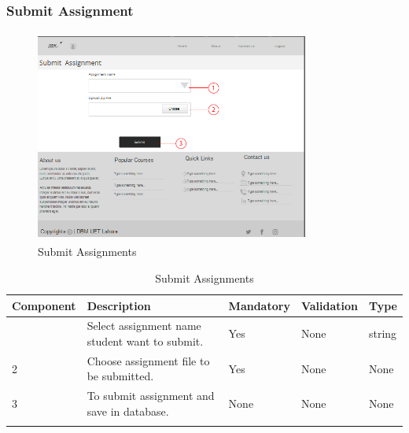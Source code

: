 \documentclass[12pt]{article}
\begin{document}
\subsubsection{Submit Assignment}
\begin{figure}[h]
  \centering
  \includegraphics[width=9cm, height=7cm]{SubmitAssignment}
  \caption{Submit Assignments}
\end{figure}

\newpage
\begin{longtable}{|>{\raggedright\arraybackslash}p{2.5cm}|>{\raggedright\arraybackslash}p{4cm}|>{\raggedright\arraybackslash}p{2.2cm}|>{\raggedright\arraybackslash}p{2cm}|>{\raggedright\arraybackslash}p{2cm}|}
\hline
\textbf{Component} & \textbf{Description} & \textbf{Mandatory} & \textbf{Validation} & \textbf{Type}\\
\hline
1 &
Select assignment name student want to submit. &
Yes &
None &
string \\
\hline

2 &
Choose assignment file to be submitted. &
Yes &
None &
None \\
\hline

3 &
To submit assignment and save in database. &
None &
None &
None \\
\hline


\caption{Submit Assignments}
\end{longtable}
\end{document}
